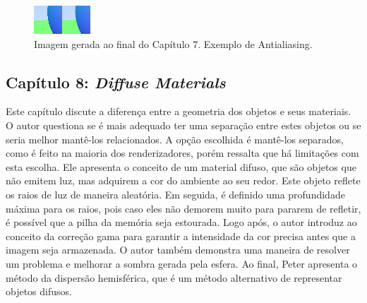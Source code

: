 \documentclass[journal]{IEEEtran}
\begin{document}
\begin{figure}[ht]
  \centering
  \includegraphics[width=\linewidth]{media/img-1.06-antialias-before-after.png}
  \caption{Imagem gerada ao final do Capítulo 7. Exemplo de Antialiasing.}
  \label{img_aa}
\end{figure}


\subsection*{Capítulo 8: \emph{Diffuse Materials}}
Este capítulo discute a diferença entre a geometria dos objetos e seus materiais. O autor questiona se é
mais adequado ter uma separação entre estes objetos ou se seria melhor mantê-los relacionados. A opção
escolhida é mantê-los separados, como é feito na maioria dos renderizadores, porém ressalta que há 
limitações com esta escolha. Ele apresenta o conceito de um material difuso, que são objetos que não
emitem luz, mas adquirem a cor do ambiente ao seu redor. Este objeto reflete os raios de luz de maneira
aleatória. Em seguida, é definido uma profundidade máxima para os raios, pois caso eles não demorem
muito para pararem de refletir, é possível que a pilha da memória seja estourada. Logo após, o autor 
introduz ao conceito da correção gama para garantir a intensidade da cor precisa antes que a imagem seja
armazenada. O autor também demonstra uma maneira de resolver um problema e melhorar a sombra gerada pela
esfera. Ao final, Peter apresenta o método da dispersão hemisférica, que é um método alternativo de 
representar objetos difusos.
\end{document}
